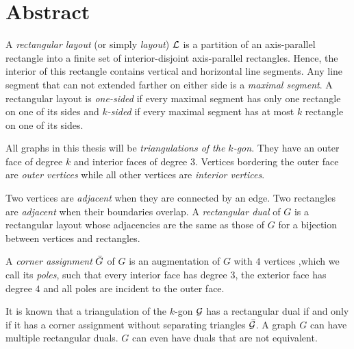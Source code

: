 
\section*{Abstract}
\thispagestyle{plain}

  A  \emph{rectangular layout} (or simply \emph{layout}) $\mathcal{L}$ is a partition of an axis-parallel rectangle into a finite set of interior-disjoint axis-parallel rectangles. Hence, the interior of this rectangle contains vertical and horizontal line segments. Any line segment that can not extended farther on either side is a \emph{maximal segment}. A rectangular layout is \emph{one-sided} if every maximal segment has only one rectangle on one of its sides and \emph{$k$-sided} if every maximal segment has at most $k$ rectangle on one of its sides.

  All graphs in this thesis will be \emph{triangulations of the $k$-gon}. They have an outer face of degree $k$ and interior faces of degree $3$.
  Vertices bordering the outer face are \emph{outer vertices} while all other vertices are \emph{interior vertices}.

  Two vertices are \emph{adjacent} when they are connected by an edge. Two rectangles are \emph{adjacent} when their boundaries overlap. A \emph{rectangular dual} of $G$ is a rectangular layout whose adjacencies are the same as those of $G$ for a bijection between vertices and rectangles.

  A \emph{corner assignment} $\bar{G}$ of $G$ is an augmentation of $G$ with $4$ vertices ,which we call its \emph{poles}, such that every interior face has degree $3$, the exterior face has degree $4$ and all poles are incident to the outer face.


  It is known that a triangulation of the $k$-gon $\mathcal{G}$ has a rectangular dual if and only if it has a corner assignment without separating triangles $\bar{\mathcal{G}}$. 
  A graph $G$ can have multiple rectangular duals. $G$ can even have duals that are not equivalent.


